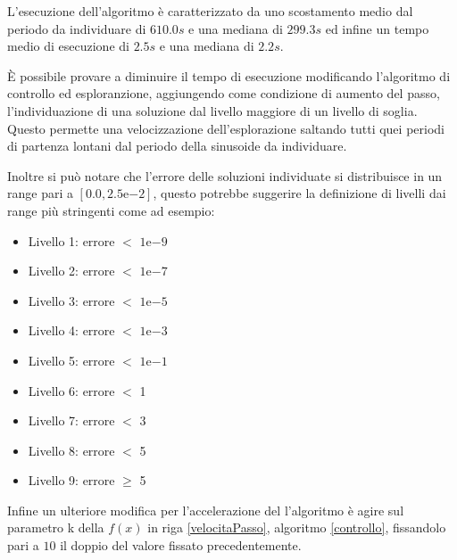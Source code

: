 \documentclass[a4paper,12pt]{report}
\newcommand{\expnumber}[2]{{#1}\mathrm{e}{#2}}
\begin{document}
L'esecuzione dell'algoritmo è caratterizzato da uno scostamento medio dal periodo da individuare di $610.0s$ e una mediana di $299.3s$ ed infine un tempo medio di esecuzione di $2.5s$ e una mediana di $2.2s$.

È possibile provare a diminuire il tempo di esecuzione modificando l'algoritmo di controllo ed esploranzione, aggiungendo come condizione di aumento del passo, l'individuazione di una soluzione dal livello maggiore di un livello di soglia. Questo permette una velocizzazione dell'esplorazione saltando tutti quei periodi di partenza lontani dal periodo della sinusoide da individuare.

Inoltre si può notare che l'errore delle soluzioni individuate si distribuisce in un range pari a $[0.0, \expnumber{2.5}{-2}]$, questo potrebbe suggerire  la definizione di livelli dai range più stringenti come ad esempio:

\begin{itemize}
  \item Livello 1: errore $<$ $\expnumber{1}{-9}$
  \item Livello 2: errore $<$ $\expnumber{1}{-7}$
  \item Livello 3: errore $<$ $\expnumber{1}{-5}$
  \item Livello 4: errore $<$ $\expnumber{1}{-3}$
  \item Livello 5: errore $<$ $\expnumber{1}{-1}$
  \item Livello 6: errore $<$ 1
  \item Livello 7: errore $<$ 3
  \item Livello 8: errore $<$ 5
  \item Livello 9: errore $\geq$ 5
\end{itemize}

Infine un ulteriore modifica per l'accelerazione del l'algoritmo è agire sul parametro k della $f(x)$ in riga \ref{velocitaPasso}, algoritmo \ref{controllo}, fissandolo pari a $10$ il doppio del valore fissato precedentemente.
\end{document}
